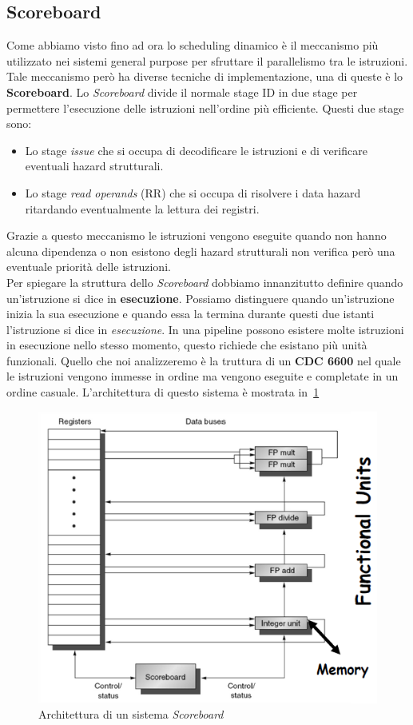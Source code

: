 \subsection{Scoreboard}
Come abbiamo visto fino ad ora lo scheduling dinamico è il meccanismo più utilizzato nei sistemi general purpose per sfruttare il parallelismo tra le istruzioni. Tale meccanismo però ha diverse tecniche di implementazione, una di queste è lo \textbf{Scoreboard}. Lo \emph{Scoreboard} divide il normale stage ID in due stage per permettere l'esecuzione delle istruzioni nell'ordine più efficiente. Questi due stage sono:
\begin{itemize}
\item Lo stage \emph{issue} che si occupa di decodificare le istruzioni e di verificare eventuali hazard strutturali.
\item Lo stage \emph{read operands} (RR) che si occupa di risolvere i data hazard ritardando eventualmente la lettura dei registri.
\end{itemize}
Grazie a questo meccanismo le istruzioni vengono eseguite quando non hanno alcuna dipendenza o non esistono degli hazard strutturali non verifica però una eventuale priorità delle istruzioni.\\
Per spiegare la struttura dello \emph{Scoreboard} dobbiamo innanzitutto definire quando un'istruzione si dice in \textbf{esecuzione}. Possiamo distinguere quando un'istruzione inizia la sua esecuzione e quando essa la termina durante questi due istanti l'istruzione si dice in \emph{esecuzione}. In una pipeline possono esistere molte istruzioni in esecuzione nello stesso momento, questo richiede che esistano più unità funzionali. Quello che noi analizzeremo è la truttura di un \textbf{CDC 6600} nel quale le istruzioni vengono immesse in ordine ma vengono eseguite e completate in un ordine casuale. L'architettura di questo sistema è mostrata in \figurename\,\ref{fig:scorearch}
\begin{figure}[htb]
\centering
\includegraphics[scale=0.5]{img/scorearch.png}
\caption{Architettura di un sistema \emph{Scoreboard}}\label{fig:scorearch}
\end{figure}
